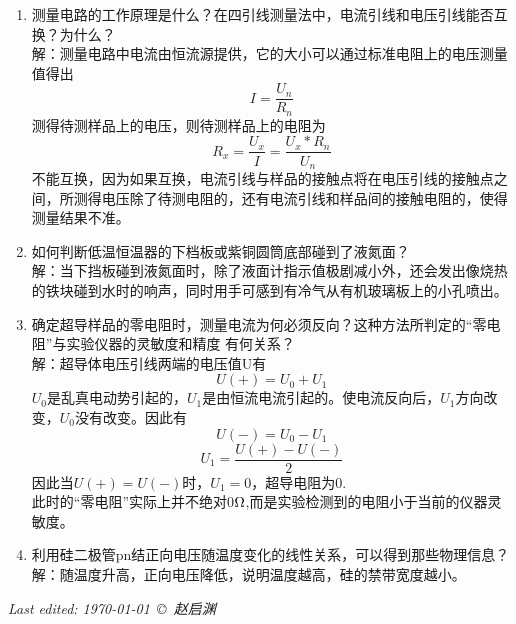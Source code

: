 \documentclass[a4paper,11pt]{article}
\begin{document}
\begin{enumerate}
	\item 测量电路的工作原理是什么？在四引线测量法中，电流引线和电压引线能否互换？为什么？\\
	解：测量电路中电流由恒流源提供，它的大小可以通过标准电阻上的电压测量值得出$$ I = \dfrac{U_n}{R_n} $$
	测得待测样品上的电压，则待测样品上的电阻为$$ R_x = \dfrac{U_x}{I} = \dfrac{U_x * R_n }{U_n} $$
	不能互换，因为如果互换，电流引线与样品的接触点将在电压引线的接触点之间，所测得电压除了待测电阻的，还有电流引线和样品间的接触电阻的，使得测量结果不准。
	\item 如何判断低温恒温器的下档板或紫铜圆筒底部碰到了液氮面？\\
	解：当下挡板碰到液氮面时，除了液面计指示值极剧减小外，还会发出像烧热的铁块碰到水时的响声，同时用手可感到有冷气从有机玻璃板上的小孔喷出。
	\item 确定超导样品的零电阻时，测量电流为何必须反向？这种方法所判定的“零电阻”与实验仪器的灵敏度和精度
	有何关系？\\
	解：超导体电压引线两端的电压值U有$$ U(+) = U_0 + U_1 $$
	$U_0$是乱真电动势引起的，$U_1$是由恒流电流引起的。使电流反向后，$U_1$方向改变，$U_0$没有改变。因此有$$ U(-) = U_0 - U_1 $$
	$$ U_1 = \dfrac{U(+)- U(-)}{2} $$
	因此当$ U(+) = U(-) $时，$ U_1 = 0 $，超导电阻为0.\\
	此时的“零电阻”实际上并不绝对0$\ohm$,而是实验检测到的电阻小于当前的仪器灵敏度。  
	\item 利用硅二极管pn结正向电压随温度变化的线性关系，可以得到那些物理信息？\\
	解：随温度升高，正向电压降低，说明温度越高，硅的禁带宽度越小。 
\end{enumerate}



	\vfill\noindent\itshape\footnotesize
	\hfill Last edited: \today\ \copyright\ 赵启渊
\end{document}
